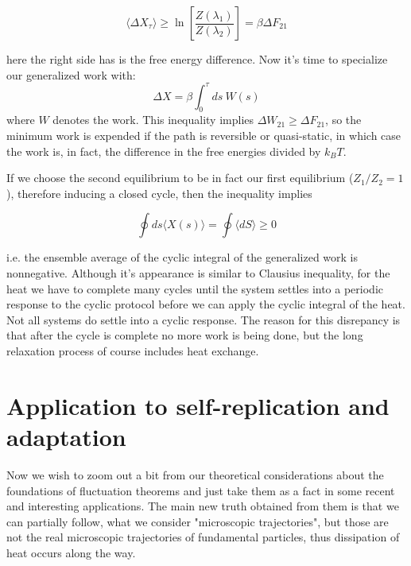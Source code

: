 \documentclass[a4paper,12pt]{article}
\begin{document}
\begin{equation}
  \langle \Delta X_\tau \rangle \geq \ln\left[\frac{Z(\lambda_1)}{Z(\lambda_2)}\right]=\beta \Delta F_{21}
\end{equation}

here the right side has is the free energy difference. Now it's time to specialize our generalized work with:
\begin{equation}
  \Delta X = \beta \int_0^\tau ds\ W(s)
\end{equation}
where $W$ denotes the work. This inequality implies $\Delta W_{21} \geq \Delta F_{21} $, so the minimum work is expended if the path is reversible or quasi-static, in which case the work is, in fact, the difference in the free energies divided by $k_B T$.

If we choose the second equilibrium to be in fact our first equilibrium ($Z_1/Z_2=1$), therefore inducing a closed cycle, then the inequality implies

\begin{equation}
\label{CyclicInequalityForGeneralizedWork}
  \oint ds \langle X(s) \rangle = \oint \langle dS \rangle \geq 0
\end{equation}

i.e. the ensemble average of the cyclic integral of the generalized work is nonnegative.
Although it's appearance is similar to Clausius inequality, for the heat we have to complete many cycles until the system settles into a periodic response to the cyclic protocol before we can apply the cyclic integral of the heat. Not all systems do settle into a cyclic response. The reason for this disrepancy is that after the cycle is complete no more work is being done, but the long relaxation process of course includes heat exchange. 

\section{Application to self-replication and adaptation}

Now we wish to zoom out a bit from our theoretical considerations about the foundations of fluctuation theorems and just take them as a fact in some recent and interesting applications\cite{Perunov:2016hl}\cite{England:2013ed}. The main new truth obtained from them is that we can partially follow, what we consider "microscopic trajectories", but those are not the real microscopic trajectories of fundamental particles, thus dissipation of heat occurs along the way.
\end{document}

